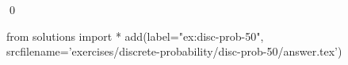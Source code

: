 
\begin{ex} 
  \label{ex:disc-prob-50}
  
  \qed
\end{ex} 
\begin{python0}
from solutions import *
add(label="ex:disc-prob-50",
    srcfilename='exercises/discrete-probability/disc-prob-50/answer.tex') 
\end{python0}
